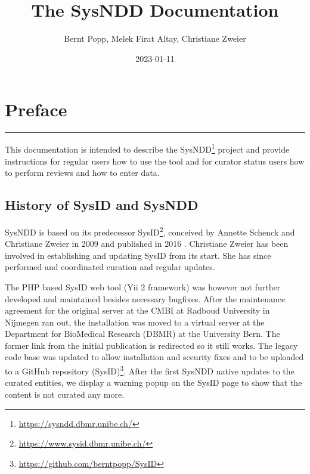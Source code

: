 \documentclass[
]{article}
\title{The SysNDD Documentation}
\author{Bernt Popp, Melek Firat Altay, Christiane Zweier}
\date{2023-01-11}
\renewcommand{\href}[2]{#2\footnote{\url{#1}}}
\begin{document}
\maketitle

{
\hypersetup{linkcolor=}
\setcounter{tocdepth}{2}
\tableofcontents
}
\hypertarget{preface}{%
\section*{Preface}\label{preface}}

\begin{center}\rule{0.5\linewidth}{0.5pt}\end{center}

This documentation is intended to describe the \href{https://sysndd.dbmr.unibe.ch/}{SysNDD} project and provide instructions for regular users how to use the tool and for curator status users how to perform reviews and how to enter data.

\hypertarget{history-of-sysid-and-sysndd}{%
\subsection*{History of SysID and SysNDD}\label{history-of-sysid-and-sysndd}}

SysNDD is based on its predecessor \href{https://www.sysid.dbmr.unibe.ch/}{SysID}, conceived by Annette Schenck and Christiane Zweier in 2009 and published in 2016 \citep{kochinke_systematic_2016}. Christiane Zweier has been involved in establishing and updating SysID from its start. She has since performed and coordinated curation and regular updates.

The PHP based SysID web tool (Yii 2 framework) was however not further developed and maintained besides necessary bugfixes. After the maintenance agreement for the original server at the CMBI at Radboud University in Nijmegen ran out, the installation was moved to a virtual server at the Department for BioMedical Research (DBMR) at the University Bern. The former link from the initial publication is redirected so it still works. The legacy code base was updated to allow installation and security fixes and to be uploaded to a \href{https://github.com/berntpopp/SysID}{GitHub repository (SysID)}. After the first SysNDD native updates to the curated entities, we display a warning popup on the SysID page to show that the content is not curated any more.
\end{document}
